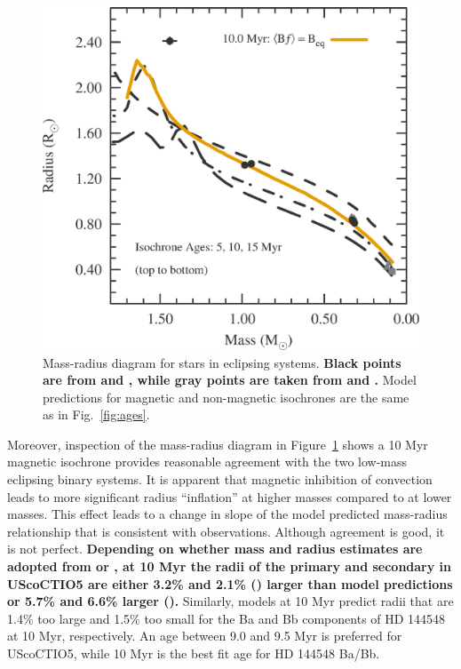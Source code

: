 \documentclass{aa}
\begin{document}
\begin{figure}[t]
    \centering
    \includegraphics[width=0.90\linewidth]{USCO5_MR.eps}
    \caption{Mass-radius diagram for stars in eclipsing systems. {\bf Black points are from \citet{Kraus2015} and \citet{Alonso2015}, while gray points are taken from \citet{Lodieu2015} and \citet{David2015b}.} Model predictions for magnetic and non-magnetic isochrones are the same as in Fig.~\ref{fig:ages}.}
    \label{fig:mrd}
\end{figure}

Moreover, inspection of the mass-radius diagram in Figure~\ref{fig:mrd} shows a 10 Myr magnetic isochrone provides reasonable agreement with the two low-mass eclipsing binary systems. It is apparent that magnetic inhibition of convection leads to more significant radius ``inflation'' at higher masses compared to at lower masses. This effect leads to a change in slope of the model predicted mass-radius relationship that is consistent with observations. Although agreement is good, it is not perfect. {\bf Depending on whether mass and radius estimates are adopted from \citet{Kraus2015} or \citet{David2015b}, at 10 Myr the radii of the primary and secondary in UScoCTIO5 are either 3.2\% and 2.1\% (\citeauthor{Kraus2015}) larger than model predictions or 5.7\% and 6.6\% larger (\citeauthor{David2015b}).} Similarly, models at 10 Myr predict radii that are 1.4\% too large and 1.5\% too small for the Ba and Bb components of HD 144548 at 10 Myr, respectively. An age between 9.0 and 9.5 Myr is preferred for UScoCTIO5, while 10 Myr is the best fit age for HD 144548 Ba/Bb. 
\end{document}
